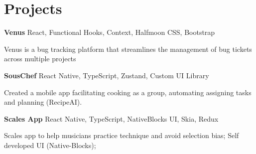 
\newenvironment{twocolentry_proj}[2][]{
    \onecolentry
    \def\secondColumn{#2}
    \setcolumnwidth{\fill, 7 cm}
    \begin{paracol}{2}
}{
    \switchcolumn \raggedleft \secondColumn
    \end{paracol}
    \endonecolentry
} %

\vspace{5 pt - 0.5 cm}
\section{Projects}
\begin{twocolentry_proj}{
    \mbox{}%
}
\fontsize{11 pt}{11 pt}\textbf{Venus} React, Functional Hooks, Context, Halfmoon CSS, Bootstrap
\end{twocolentry_proj}

\begin{onecolentry}
    \begin{highlights}
        \item Venus is a bug tracking platform that streamlines the management of bug tickets across multiple projects
    \end{highlights}
\end{onecolentry}

\vspace{0.10 cm}
\begin{twocolentry_proj}{
    \mbox{}%
}
\fontsize{11 pt}{11 pt}\textbf{SousChef} React Native, TypeScript, Zustand, Custom UI Library  
\end{twocolentry_proj}
\begin{onecolentry}
    \begin{highlights}
        \item Created a mobile app facilitating cooking as a group, automating assigning tasks and planning (RecipeAI).
    \end{highlights}
\end{onecolentry}

\vspace{0.10 cm}
\begin{twocolentry_proj}{
    \mbox{}%
}
\fontsize{11 pt}{11 pt}\textbf{Scales App} React Native, TypeScript, NativeBlocks UI, Skia, Redux
\end{twocolentry_proj}
\begin{onecolentry}
    \begin{highlights}
        \item Scales app to help musicians practice technique and avoid selection bias; Self developed UI (Native-Blocks);
    \end{highlights}
\end{onecolentry}
